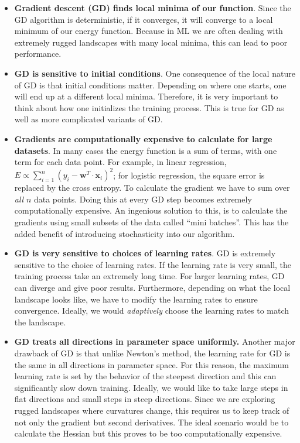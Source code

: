 \documentclass[%
oneside,                 %
final,                   %
10pt]{article}
\begin{document}
\begin{itemize}
\item \textbf{Gradient descent (GD) finds local minima of our function}. Since the GD algorithm is deterministic, if it converges, it will converge to a local minimum of our energy function. Because in ML we are often dealing with extremely rugged landscapes with many local minima, this can lead to poor performance.

\item \textbf{GD is sensitive to initial conditions}. One consequence of the local nature of GD is that initial conditions matter. Depending on where one starts, one will end up at a different local minima. Therefore, it is very important to think about how one initializes the training process. This is true for GD as well as more complicated variants of GD.

\item \textbf{Gradients are computationally expensive to calculate for large datasets}. In many cases the energy function is a sum of terms, with one term for each data point. For example, in linear regression, $E \propto \sum_{i=1}^n (y_i - \mathbf{w}^T\cdot\mathbf{x}_i)^2$; for logistic regression, the square error is replaced by the cross entropy. To calculate the gradient we have to sum over \emph{all} $n$ data points. Doing this at every GD step becomes extremely computationally expensive. An ingenious solution to this, is to calculate the gradients using small subsets of the data called ``mini batches''. This has the added benefit of introducing stochasticity into our algorithm.

\item \textbf{GD is very sensitive to choices of learning rates}. GD is extremely sensitive to the choice of learning rates. If the learning rate is very small, the training process take an extremely long time. For larger learning rates, GD can diverge and give poor results. Furthermore, depending on what the local landscape looks like, we have to modify the learning rates to ensure convergence. Ideally, we would \emph{adaptively} choose the learning rates to match the landscape.

\item \textbf{GD treats all directions in parameter space uniformly.} Another major drawback of GD is that unlike Newton's method, the learning rate for GD is the same in all directions in parameter space. For this reason, the maximum learning rate is set by the behavior of the steepest direction and this can significantly slow down training. Ideally, we would like to take large steps in flat directions and small steps in steep directions. Since we are exploring rugged landscapes where curvatures change, this requires us to keep track of not only the gradient but second derivatives. The ideal scenario would be to calculate the Hessian but this proves to be too computationally expensive. 


\end{itemize}
\end{document}
